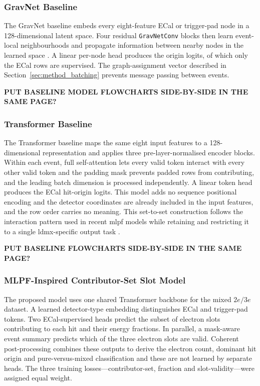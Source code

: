 \subsubsection{GravNet Baseline}

The GravNet baseline embeds every eight-feature ECal or trigger-pad node in a
128-dimensional latent space. Four residual \texttt{GravNetConv} blocks then
learn event-local neighbourhoods and propagate information between nearby
nodes in the learned space \cite{qasim2019-gravnet}. A linear per-node head
produces the origin logits, of which only the ECal rows are supervised. The
graph-assignment vector described in
Section~\ref{sec:method_batching} prevents message passing between events.

\textbf{PUT BASELINE MODEL FLOWCHARTS SIDE-BY-SIDE IN THE SAME PAGE?}



\subsubsection{Transformer Baseline}

The Transformer baseline maps the same eight input features to a
128-dimensional representation and applies three pre-layer-normalised
encoder blocks. Within each event, full self-attention lets every valid token
interact with every other valid token and the padding mask prevents padded rows
from contributing, and the leading batch dimension is processed
independently. A linear token head produces the ECal hit-origin logits. This
model adds no sequence positional encoding and the detector coordinates are already
included in the input features, and the row order carries no meaning. This
set-to-set construction follows the interaction pattern used in recent
\gls{mlpf} models while retaining and restricting it to a single \gls{ldmx}-specific output task
\cite{pata2026-mlpf}.

\textbf{PUT BASELINE FLOWCHARTS SIDE-BY-SIDE IN THE SAME PAGE?}



\subsubsection{MLPF-Inspired Contributor-Set Slot Model}

The proposed model uses one shared Transformer backbone for the mixed
\(2e/3e\) dataset. A learned detector-type embedding distinguishes ECal and
trigger-pad tokens. Two ECal-supervised heads predict the subset of electron
slots contributing to each hit and their energy fractions. In parallel, a
mask-aware event summary predicts which of the three electron slots are
valid. Coherent post-processing combines these outputs to derive the electron
count, dominant hit origin and pure-versus-mixed classification and these are
not learned by separate heads. The three training losses---contributor-set,
fraction and slot-validity---were assigned equal weight.


